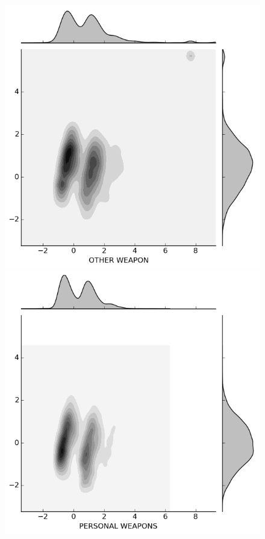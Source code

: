 \documentclass{evanarticle}
\begin{document}
\begin{figure}[H]
\begin{minipage}[b]{0.20\linewidth}
  \end{minipage}
  \quad
  \begin{minipage}[b]{0.20\linewidth}
    \includegraphics[width=\linewidth]{images/weapon/OTHER_WEAPON.png}
  \end{minipage}
  \quad
  \begin{minipage}[b]{0.20\linewidth}
    \includegraphics[width=\linewidth]{images/weapon/PERSONAL_WEAPONS.png}
  \end{minipage}


\end{figure}
\end{document}
